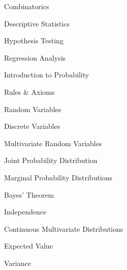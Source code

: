 \begin{frame}{Combinatorics}
\end{frame}

\begin{frame}{Descriptive Statistics}
\end{frame}

\begin{frame}{Hypothesis Testing}
\end{frame}

\begin{frame}{Regression Analysis}
\end{frame}


\begin{frame}{Introduction to Probability}
\end{frame}

\begin{frame}{Rules \& Axioms}
\end{frame}

\begin{frame}{Random Variables}
\end{frame}

\begin{frame}{Discrete Variables}
\end{frame}

\begin{frame}{Multivariate Random Variables}
\end{frame}

\begin{frame}{Joint Probability Distribution}
\end{frame}

\begin{frame}{Marginal Probability Distributions}
\end{frame}

\begin{frame}{Bayes’ Theorem}
\end{frame}

\begin{frame}{Independence}
\end{frame}

\begin{frame}{Continuous Multivariate Distributions}
\end{frame}

\begin{frame}{Expected Value}
\end{frame}

\begin{frame}{Variance}
\end{frame}


